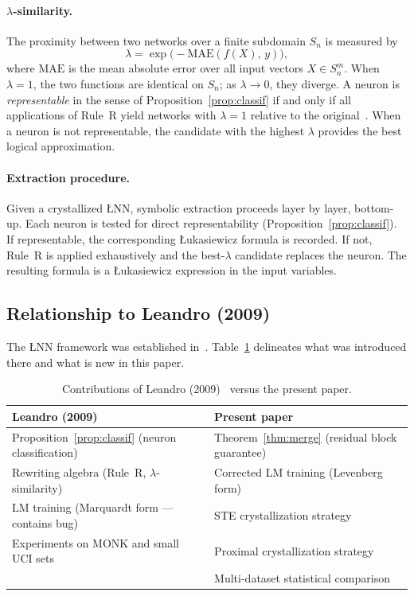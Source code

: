 \documentclass[12pt,a4paper]{article}
\newcommand{\LNN}{\L{}NN}
\begin{document}
\paragraph{$\lambda$-similarity.}
The proximity between two networks over a finite subdomain $S_n$ is measured by
\begin{equation}
  \lambda = \exp\bigl(-\mathrm{MAE}(f(X),\, y)\bigr),
  \label{eq:lambda}
\end{equation}
where $\mathrm{MAE}$ is the mean absolute error over all input vectors $X \in S_n^m$.
When $\lambda = 1$, the two functions are identical on $S_n$; as $\lambda \to 0$,
they diverge.
A neuron is \emph{representable} in the sense of Proposition~\ref{prop:classif}
if and only if all applications of Rule~R yield networks with $\lambda = 1$
relative to the original~\cite{leandro2009}.
When a neuron is not representable, the candidate with the highest $\lambda$
provides the best logical approximation.

\paragraph{Extraction procedure.}
Given a crystallized \LNN{}, symbolic extraction proceeds layer by layer,
bottom-up.
Each neuron is tested for direct representability (Proposition~\ref{prop:classif}).
If representable, the corresponding \L{}ukasiewicz formula is recorded.
If not, Rule~R is applied exhaustively and the best-$\lambda$ candidate
replaces the neuron.
The resulting formula is a \L{}ukasiewicz expression in the input variables.

\subsection{Relationship to Leandro (2009)}
\label{ssec:prior}

The \LNN{} framework was established in~\cite{leandro2009}.
Table~\ref{tab:contributions} delineates what was introduced there and what
is new in this paper.

\begin{table}[h]
\centering
\caption{Contributions of Leandro (2009)~\cite{leandro2009} versus the
present paper.}
\label{tab:contributions}
\setlength{\tabcolsep}{4pt}
\begin{tabular}{ll}
\toprule
Leandro (2009) & Present paper \\
\midrule
Proposition~\ref{prop:classif} (neuron classification) &
  Theorem~\ref{thm:merge} (residual block guarantee) \\
Rewriting algebra (Rule~R, $\lambda$-similarity) &
  Corrected LM training (Levenberg form) \\
LM training (Marquardt form --- contains bug) &
  STE crystallization strategy \\
Experiments on MONK and small UCI sets &
  Proximal crystallization strategy \\
 & Multi-dataset statistical comparison \\
\bottomrule
\end{tabular}
\end{table}
\end{document}
